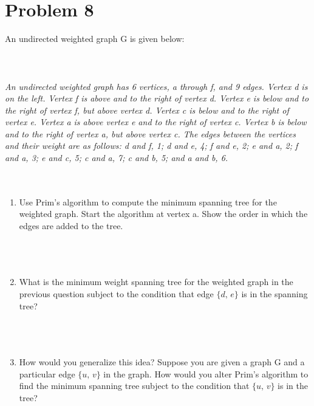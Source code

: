 \documentclass{amsart}
\theoremstyle{definition}
\theoremstyle{Exercise}
\theoremstyle{remark}
\theoremstyle{rule}
\numberwithin{equation}{section}
\begin{document}
\section*{Problem 8}
An undirected weighted graph G is given below:\\\\
\\\\
{\color{blue}{\bf Figure 16:} \emph{An undirected weighted graph has 6 vertices, a through f, and 9 edges. Vertex d is on the left. Vertex f is above and to the right of vertex d. Vertex e is below and to the right of vertex f, but above vertex d. Vertex c is below and to the right of vertex e. Vertex a is above vertex e and to the right of vertex c. Vertex b is below and to the right of vertex a, but above vertex c. The edges between the vertices and their weight are as follows: d and f, 1; d and e, 4; f and e, 2; e and a, 2; f and a, 3; e and c, 5; c and a, 7; c and b, 5; and a and b, 6.
\\
}
}
\\
\\
\begin{enumerate}[label=(\alph*)]
\item Use Prim's algorithm to compute the minimum spanning tree for the weighted graph. Start the algorithm at vertex a. Show the order in which the edges are added to the tree.\\\\
\\\\
\item What is the minimum weight spanning tree for the weighted graph in the previous question subject to the condition that edge $\{d,\, e\}$ is in the spanning tree?\\\\\\\\
\item How would you generalize this idea? Suppose you are given a graph G and a particular edge $\{u,\,v\}$ in the graph. How would you alter Prim's algorithm to find the minimum spanning tree subject to the condition that $\{u,\,v\}$ is in the tree?\\\\
\\\\
\end{enumerate}
\end{document}
